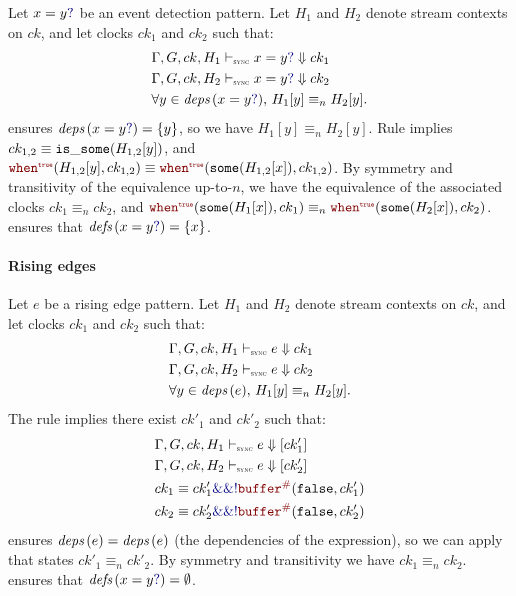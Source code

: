\begin{skippableproof}
    Let $\detect{x}{y}$ be an event detection pattern.
    Let $H_1$ and $H_2$ denote stream contexts on $ck$, and let clocks $ck_1$ and $ck_2$ such that:
    \begin{align*}
         & \epatDenot{H_1}{ck}{\detect{x}{y}}{ck_1}                       \\
         & \epatDenot{H_2}{ck}{\detect{x}{y}}{ck_2}                       \\
         & \forall y \in \deps{\detect{x}{y}}, \, H_1[y] \equiv_n H_2[y].
    \end{align*}
     ensures
    $\deps{\detect{x}{y}}= \{y\}$, so we have $H_1[y] \equiv_n H_2[y]$.
    Rule  implies $ck_{1,2} \equiv
        \isSome{H_{1,2}[y]}$, and $\whenT{H_{1,2}[y]}{ck_{1,2}} \equiv
        \whenT{\some{H_{1,2}[x]}}{ck_{1,2}}$.
    By symmetry and transitivity of the equivalence up-to-$n$, we have the equivalence of the
    associated clocks $ck_1 \equiv_n ck_2$, and $\whenT{\some{H_1[x]}}{ck_1} \equiv_n
        \whenT{\some{H_2[x]}}{ck_2}$.
     ensures that $\defs{\detect{x}{y}} =
        \{x\}$.

    \paragraph{Rising edges}

    Let $e$ be a rising edge pattern.
    Let $H_1$ and $H_2$ denote stream contexts on $ck$, and let clocks $ck_1$ and $ck_2$ such that:
    \begin{align*}
         & \epatDenot{H_1}{ck}{e}{ck_1}                       \\
         & \epatDenot{H_2}{ck}{e}{ck_2}                       \\
         & \forall y \in \deps{e}, \, H_1[y] \equiv_n H_2[y].
    \end{align*}
    The rule  implies there exist $ck'_1$ and $ck'_2$
    such that:
    \begin{align*}
         & \exprDenot{H_1}{ck}{e}{ck'_1}                               \\
         & \exprDenot{H_2}{ck}{e}{ck'_2}                               \\
         & ck_1 \equiv ck'_1 \kwf{\&\&} \kwf{!} \buffer{\false}{ck'_1} \\
         & ck_2 \equiv ck'_2 \kwf{\&\&} \kwf{!} \buffer{\false}{ck'_2}
    \end{align*}
     ensures
    $\deps{e}= \deps{e}$ (the dependencies of the expression), so we can apply  that states $ck'_1 \equiv_n ck'_2$.
    By symmetry and transitivity we have $ck_1 \equiv_n ck_2$.
     ensures that $\defs{\detect{x}{y}} =
        \emptyset$.

    \setcounter{paragraph}{0}
\end{skippableproof}


